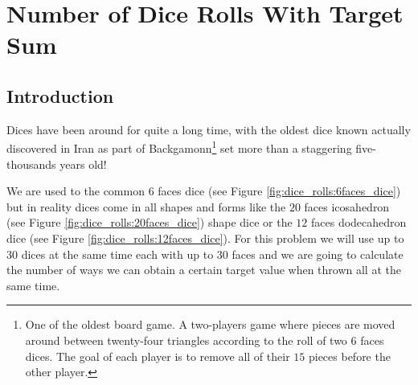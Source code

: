 %

\chapter{Number of Dice Rolls With Target Sum}
\label{ch:dice_rolls}
\section*{Introduction}
Dices have been around for quite a long time, with the oldest dice known actually discovered in Iran
as part of Backgamonn\footnote{One of the oldest board game. A two-players game where pieces are
moved around between twenty-four triangles according to the roll of two $6$ faces dices. The goal of
each player is to remove all of their $15$ pieces before the other player.} set more than a
staggering five-thousands years old! 

We are used to the common $6$ faces dice (see Figure \ref{fig:dice_rolls:6faces_dice}) but in
reality dices come in all shapes and forms like the $20$ faces icosahedron (see Figure
\ref{fig:dice_rolls:20faces_dice}) shape dice or the $12$ faces dodecahedron dice (see Figure
\ref{fig:dice_rolls:12faces_dice}). For this problem we will use up to $30$ dices at the same time
each with up to $30$ faces and we are going to calculate the number of ways we can obtain a certain
target value when thrown all at the same time.


